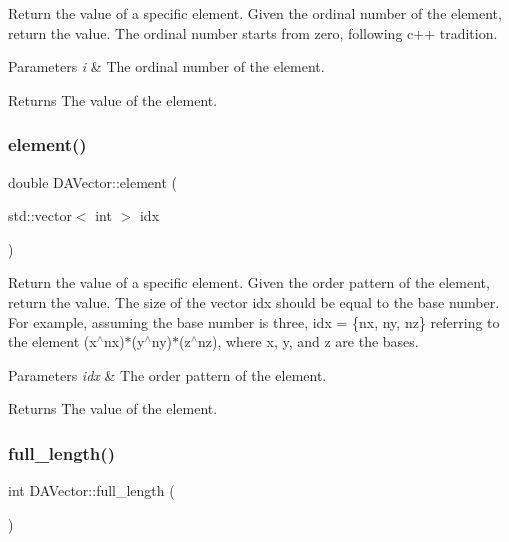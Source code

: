 Return the value of a specific element. Given the ordinal number of the element, return the value. The ordinal number starts from zero, following c++ tradition. 


\begin{DoxyParams}{Parameters}
{\em i} & The ordinal number of the element. \\
\hline
\end{DoxyParams}
\begin{DoxyReturn}{Returns}
The value of the element. 
\end{DoxyReturn}
\mbox{\label{struct_d_a_vector_a53070a432d184992aaaa69e1cb9f609d}} 
\subsubsection{\texorpdfstring{element()}{element()}\hspace{0.1cm}{\footnotesize\ttfamily [4/4]}}
{\footnotesize\ttfamily double D\+A\+Vector\+::element (\begin{DoxyParamCaption}\item[{std\+::vector$<$ int $>$}]{idx }\end{DoxyParamCaption})}



Return the value of a specific element. Given the order pattern of the element, return the value. The size of the vector idx should be equal to the base number. For example, assuming the base number is three, idx = \{nx, ny, nz\} referring to the element (x$^\wedge$nx)$\ast$(y$^\wedge$ny)$\ast$(z$^\wedge$nz), where x, y, and z are the bases. 


\begin{DoxyParams}{Parameters}
{\em idx} & The order pattern of the element. \\
\hline
\end{DoxyParams}
\begin{DoxyReturn}{Returns}
The value of the element. 
\end{DoxyReturn}
\mbox{\label{struct_d_a_vector_a68677512679c5151a59e0e6a2306fdee}} 
\subsubsection{\texorpdfstring{full\_length()}{full\_length()}}
{\footnotesize\ttfamily int D\+A\+Vector\+::full\+\_\+length (\begin{DoxyParamCaption}{ }\end{DoxyParamCaption})\hspace{0.3cm}{\ttfamily [static]}}

